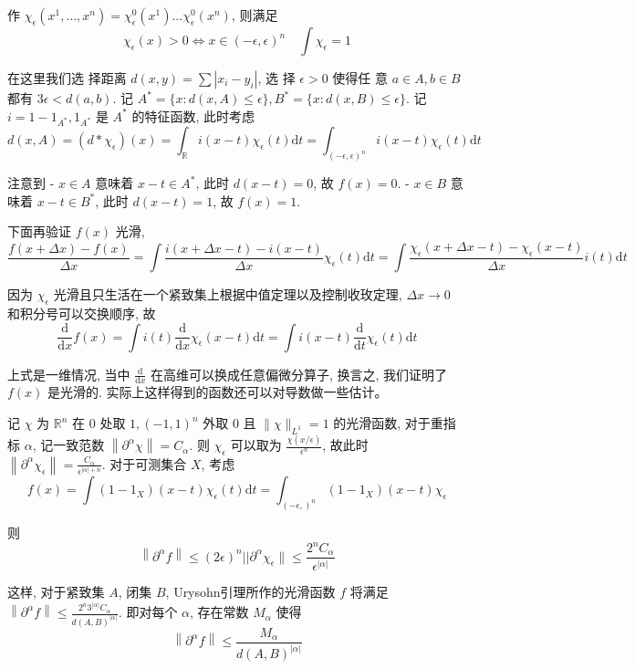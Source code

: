 \documentclass[options]{article}
\begin{document}
作 $\chi_\epsilon\left(x^1, \ldots, x^n\right)=\chi_\epsilon^0\left(x^1\right) \ldots \chi_\epsilon^0\left(x^n\right)$, 则满足
\[
\chi_\epsilon(x)>0 \Longleftrightarrow x \in(-\epsilon, \epsilon)^n \quad \int \chi_\epsilon=1
\]

在这里我们选 择距离 $d(x, y)=\sum\left|x_i-y_i\right|$, 选 择 $\epsilon>0$ 使得任 意 $a \in A, b \in B$ 都有 $3 \epsilon<d(a, b)$. 记 $A^*=\{x: d(x, A) \leq \epsilon\}, B^*=\{x: d(x, B) \leq \epsilon\}$. 记 $i=1-1_{A^*}, 1_{A^*}$ 是 $A^*$ 的特征函数, 此时考虑
\[
d(x, A)=\left(d * \chi_\epsilon\right)(x)=\int_{\mathbb{R}} i(x-t) \chi_\epsilon(t) \mathrm{d} t=\int_{(-\epsilon, \epsilon)^n} i(x-t) \chi_\epsilon(t) \mathrm{d} t
\]

注意到
- $x \in A$ 意味着 $x-t \in A^*$, 此时 $d(x-t)=0$, 故 $f(x)=0$.
- $x \in B$ 意味着 $x-t \in B^*$, 此时 $d(x-t)=1$, 故 $f(x)=1$.

下面再验证 $f(x)$ 光滑,
\[
\frac{f(x+\Delta x)-f(x)}{\Delta x}=\int \frac{i(x+\Delta x-t)-i(x-t)}{\Delta x} \chi_\epsilon(t) \mathrm{d} t=\int \frac{\chi_\epsilon(x+\Delta x-t)-\chi_\epsilon(x-t)}{\Delta x} i(t) \mathrm{d} t
\]

因为 $\chi_\epsilon$ 光滑且只生活在一个紧致集上根据中值定理以及控制收玫定理, $\Delta x \rightarrow 0$ 和积分号可以交换顺序, 故
\[
\frac{\mathrm{d}}{\mathrm{d} x} f(x)=\int i(t) \frac{\mathrm{d}}{\mathrm{d} x} \chi_\epsilon(x-t) \mathrm{d} t=\int i(x-t) \frac{\mathrm{d}}{\mathrm{d} t} \chi_\epsilon(t) \mathrm{d} t
\]

上式是一维情况, 当中 $\frac{\mathrm{d}}{\mathrm{d} x}$ 在高维可以换成任意偏微分算子, 换言之, 我们证明了 $f(x)$ 是光滑的.
实际上这样得到的函数还可以对导数做一些估计。

记 $\chi$ 为 $\mathbb{R}^n$ 在 0 处取 $1,(-1,1)^n$ 外取 0 且 $\|\chi\|_{L^1}=1$ 的光滑函数, 对于重指标 $\alpha$, 记一致范数 $\left\|\partial^\alpha \chi\right\|=C_\alpha$. 则 $\chi_\epsilon$ 可以取为 $\frac{\chi(x / \epsilon)}{\epsilon^n}$, 故此时 $\left\|\partial^\alpha \chi_\epsilon\right\|=\frac{C_\alpha}{\epsilon^{|\alpha|+n}}$. 对于可测集合 $X$, 考虑
\[
f(x)=\int\left(1-1_X\right)(x-t) \chi_\epsilon(t) \mathrm{d} t=\int_{(-\epsilon,)^n}\left(1-1_X\right)(x-t) \chi_\epsilon
\]

则
\[
\left\|\partial^\alpha f\right\| \leq(2 \epsilon)^n|| \partial^\alpha \chi_\epsilon \| \leq \frac{2^n C_\alpha}{\epsilon^{|\alpha|}}
\]

这样, 对于紧致集 $A$, 闭集 $B$, Urysohn引理所作的光滑函数 $f$ 将满足 $\left\|\partial^\alpha f\right\| \leq \frac{2^n 3^{|\alpha|} C_\alpha}{d(A, B)^{|\alpha|}}$. 即对每个 $\alpha$, 存在常数 $M_\alpha$ 使得
\[
\left\|\partial^\alpha f\right\| \leq \frac{M_\alpha}{d(A, B)^{|\alpha|}}
\]
\end{document}
